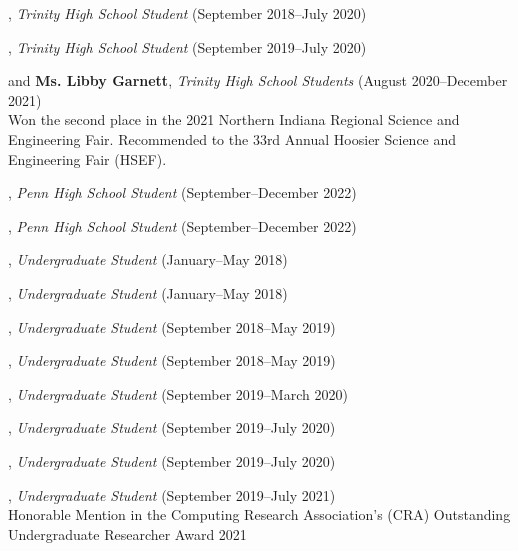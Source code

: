 \documentclass[10pt]{article}
\newenvironment{myindentpar}[1]%
{\begin{list}{}%
         {\setlength{\leftmargin}{#1}}%
         \item[]%
}
{\end{list}}
\newcounter{list}
\begin{document}
\begin{myindentpar}{0.75cm}

\hspace{-0.75cm}{\bf Eric Zhang}, \textit{Trinity High School Student} (September 2018--July 2020)

\hspace{-0.75cm}{\bf Michael Florin}, \textit{Trinity High School Student} (September 2019--July 2020)

\hspace{-0.75cm}{\bf Ms. Rebekah Fang} and {\bf Ms. Libby Garnett}, \textit{Trinity High School Students} (August 2020--December 2021) \\
	Won the second place in the 2021 Northern Indiana Regional Science and Engineering Fair. Recommended to the 33rd Annual Hoosier Science and Engineering Fair (HSEF).

\hspace{-0.75cm}{\bf Ishita Masetty}, \textit{Penn High School Student} (September--December 2022)

\hspace{-0.75cm}{\bf Jake Ciliberti}, \textit{Penn High School Student} (September--December 2022)

\hspace{-0.75cm}{\bf Matthew Malir}, \textit{Undergraduate Student} (January--May 2018)
	
\hspace{-0.75cm}{\bf Sebastian Miner}, \textit{Undergraduate Student} (January--May 2018)

\hspace{-0.75cm}{\bf Matthew Schoenbauer}, \textit{Undergraduate Student} (September 2018--May 2019)
	
\hspace{-0.75cm}{\bf Ms. Yuhan (Tina) Wu}, \textit{Undergraduate Student} (September 2018--May 2019)

\hspace{-0.75cm}{\bf Chan Hee Song}, \textit{Undergraduate Student} (September 2019--March 2020)

\hspace{-0.75cm}{\bf Xiangyu Dong}, \textit{Undergraduate Student} (September 2019--July 2020)

\hspace{-0.75cm}{\bf Tianze Zheng}, \textit{Undergraduate Student} (September 2019--July 2020)

\hspace{-0.75cm}{\bf Bo Ni}, \textit{Undergraduate Student} (September 2019--July 2021) \\
	Honorable Mention in the Computing Research Association's (CRA) Outstanding Undergraduate Researcher Award 2021


\end{myindentpar}
\end{document}
